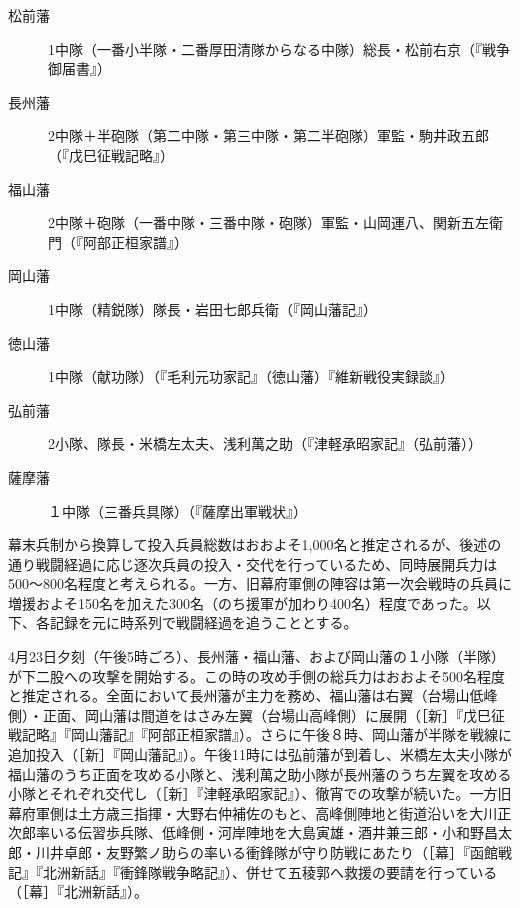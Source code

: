 \documentclass[11pt,report]{jsarticle}
\begin{document}
\begin{description}
\item [松前藩] 1中隊（一番小半隊・二番厚田清隊からなる中隊）総長・松前右京（『戦争御届書』）
\item [長州藩] 2中隊＋半砲隊（第二中隊・第三中隊・第二半砲隊）軍監・駒井政五郎（『戊巳征戦記略』）
\item [福山藩] 2中隊＋砲隊（一番中隊・三番中隊・砲隊）軍監・山岡運八、関新五左衛門（『阿部正桓家譜』）
\item [岡山藩] 1中隊（精鋭隊）隊長・岩田七郎兵衛（『岡山藩記』）
\item [徳山藩] 1中隊（献功隊）（『毛利元功家記』（徳山藩）『維新戦役実録談』）
\item [弘前藩] 2小隊、隊長・米橋左太夫、浅利萬之助（『津軽承昭家記』（弘前藩））
\item [薩摩藩] １中隊（三番兵具隊）（『薩摩出軍戦状』）
\end{description}

幕末兵制から換算して投入兵員総数はおおよそ1,000名と推定されるが、後述の通り戦闘経過に応じ逐次兵員の投入・交代を行っているため、同時展開兵力は500～800名程度と考えられる。一方、旧幕府軍側の陣容は第一次会戦時の兵員に増援およそ150名を加えた300名（のち援軍が加わり400名）程度であった。以下、各記録を元に時系列で戦闘経過を追うこととする。

4月23日夕刻（午後5時ごろ）、長州藩・福山藩、および岡山藩の１小隊（半隊）が下二股への攻撃を開始する。この時の攻め手側の総兵力はおおよそ500名程度と推定される。全面において長州藩が主力を務め、福山藩は右翼（台場山低峰側）・正面、岡山藩は間道をはさみ左翼（台場山高峰側）に展開（［新］『戊巳征戦記略』『岡山藩記』『阿部正桓家譜』）。さらに午後８時、岡山藩が半隊を戦線に追加投入（［新］『岡山藩記』）。午後11時には弘前藩が到着し、米橋左太夫小隊が福山藩のうち正面を攻める小隊と、浅利萬之助小隊が長州藩のうち左翼を攻める小隊とそれぞれ交代し（［新］『津軽承昭家記』）、徹宵での攻撃が続いた。一方旧幕府軍側は土方歳三指揮・大野右仲補佐のもと、高峰側陣地と街道沿いを大川正次郎率いる伝習歩兵隊、低峰側・河岸陣地を大島寅雄・酒井兼三郎・小和野昌太郎・川井卓郎・友野繁ノ助らの率いる衝鋒隊が守り防戦にあたり（［幕］『函館戦記』『北洲新話』『衝鋒隊戦争略記』）、併せて五稜郭へ救援の要請を行っている（［幕］『北洲新話』）。
\end{document}
